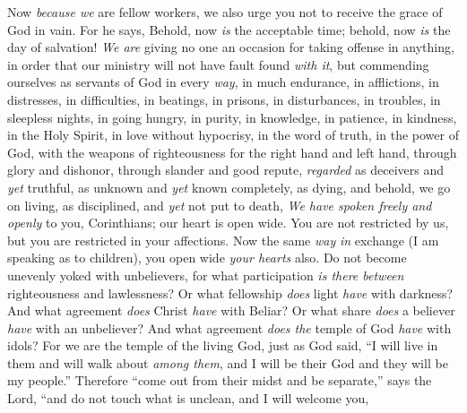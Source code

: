 \begin{biblechapter} %
 Now \textit{because we} are fellow workers, we also urge you not to receive the grace of God in vain.
\verse For he says,
\verse Behold, now \textit{is} the acceptable time; behold, now \textit{is} the day of salvation!
\verse \textit{We are} giving no one an occasion for taking offense in anything, in order that our ministry will not have fault found \textit{with it},
\verse but commending ourselves as servants of God in every \textit{way}, in much endurance, in afflictions, in distresses, in difficulties,
\verse in beatings, in prisons, in disturbances, in troubles, in sleepless nights, in going hungry,
\verse in purity, in knowledge, in patience, in kindness, in the Holy Spirit, in love without hypocrisy,
\verse in the word of truth, in the power of God, with the weapons of righteousness for the right hand and left hand,
\verse through glory and dishonor, through slander and good repute, \textit{regarded} as deceivers and \textit{yet} truthful,
\verse as unknown and \textit{yet} known completely, as dying, and behold, we go on living, as disciplined, and \textit{yet} not put to death,
\verse \textit{We have spoken freely and openly} to you, Corinthians; our heart is open wide.
\verse You are not restricted by us, but you are restricted in your affections.
\verse Now the same \textit{way} \textit{in} exchange (I am speaking as to children), you open wide \textit{your hearts} also.
 Do not become unevenly yoked with unbelievers, for what participation \textit{is there between} righteousness and lawlessness? Or what fellowship \textit{does} light \textit{have} with darkness?
\verse And what agreement \textit{does} Christ \textit{have} with Beliar? Or what share \textit{does} a believer \textit{have} with an unbeliever?
\verse And what agreement \textit{does the} temple of God \textit{have} with idols? For we are the temple of the living God, just as God said,
\verse “I will live in them and will walk about \textit{among them}, 
and I will be their God and they will be my people.”
\verse Therefore “come out from their midst 
and be separate,” says the Lord, 
“and do not touch what is unclean, 
and I will welcome you,
\end{biblechapter}

